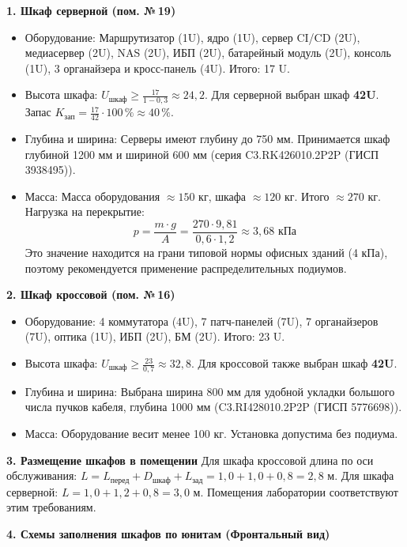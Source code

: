 \documentclass{bmstu}
\begin{document}
\textbf{1. Шкаф серверной (пом. №\,19)}
\begin{itemize}
    \item Оборудование: Маршрутизатор (1U), ядро (1U), сервер CI/CD (2U), медиасервер (2U), NAS (2U), ИБП (2U), батарейный модуль (2U), консоль (1U), 3 органайзера и кросс-панель (4U). Итого: 17 U.
    \item Высота шкафа: $U_{\text{шкаф}} \ge \frac{17}{1 - 0{,}3} \approx 24{,}2$. Для серверной выбран шкаф \textbf{42U}. Запас $K_{\text{зап}} = \frac{17}{42} \cdot 100\,\% \approx 40\,\%$.
    \item Глубина и ширина: Серверы имеют глубину до 750 мм. Принимается шкаф глубиной 1200 мм и шириной 600 мм (серия C3.RK426010.2P2P (ГИСП 3938495)).
    \item Масса: Масса оборудования $\approx 150$ кг, шкафа $\approx 120$ кг. Итого $\approx 270$ кг. Нагрузка на перекрытие:
    \begin{equation}
        p = \frac{m \cdot g}{A} = \frac{270 \cdot 9{,}81}{0{,}6 \cdot 1{,}2} \approx 3{,}68 \text{ кПа}
    \end{equation}
    Это значение находится на грани типовой нормы офисных зданий (4 кПа), поэтому рекомендуется применение распределительных подиумов.
\end{itemize}

\textbf{2. Шкаф кроссовой (пом. №\,16)}
\begin{itemize}
    \item Оборудование: 4 коммутатора (4U), 7 патч-панелей (7U), 7 органайзеров (7U), оптика (1U), ИБП (2U), БМ (2U). Итого: 23 U.
    \item Высота шкафа: $U_{\text{шкаф}} \ge \frac{23}{0{,}7} \approx 32{,}8$. Для кроссовой также выбран шкаф \textbf{42U}.
    \item Глубина и ширина: Выбрана ширина 800 мм для удобной укладки большого числа пучков кабеля, глубина 1000 мм (C3.RI428010.2P2P (ГИСП 5776698)). 
    \item Масса: Оборудование весит менее 100 кг. Установка допустима без подиума.
\end{itemize}

\textbf{3. Размещение шкафов в помещении}
Для шкафа кроссовой длина по оси обслуживания: $L = L_{\text{перед}} + D_{\text{шкаф}} + L_{\text{зад}} = 1{,}0 + 1{,}0 + 0{,}8 = 2{,}8$ м.
Для шкафа серверной: $L = 1{,}0 + 1{,}2 + 0{,}8 = 3{,}0$ м.
Помещения лаборатории соответствуют этим требованиям.

\textbf{4. Схемы заполнения шкафов по юнитам (Фронтальный вид)}
\end{document}
